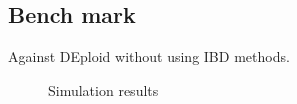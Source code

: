 \documentclass{article}
\begin{document}
\subsection{Bench mark}
Against DEploid without using IBD methods.
\begin{figure}[htp]
  \centering{}
  \caption{Simulation results}
\end{figure}
\end{document}
